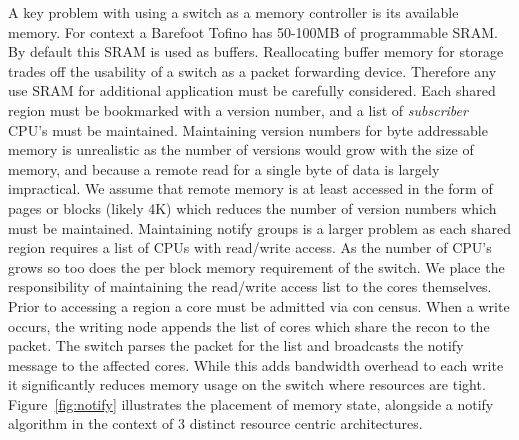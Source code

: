 A key problem with using a switch as a memory controller is its
available memory. For context a Barefoot Tofino has 50-100MB of
programmable SRAM. By default this SRAM is used as buffers.
Reallocating buffer memory for storage trades off the usability of a
switch as a packet forwarding device. Therefore any use SRAM for
additional application must be carefully considered. Each shared
region must be bookmarked with a version number, and a list of
\textit{subscriber} CPU's must be maintained.  Maintaining version
numbers for byte addressable memory is unrealistic as the number of
versions would grow with the size of memory, and because a remote read
for a single byte of data is largely impractical. We assume that
remote memory is at least accessed in the form of pages or blocks
(likely 4K) which reduces the number of version numbers which must be
maintained.  Maintaining notify groups is a larger problem as each
shared region requires a list of CPUs with read/write access. As the
number of CPU's grows so too does the per block memory requirement of
the switch.  We place the responsibility of maintaining the read/write
access list to the cores themselves.  Prior to accessing a region a
core must be admitted via con census.  When a write occurs, the
writing node appends the list of cores which share the recon to the
packet. The switch parses the packet for the list and broadcasts the
notify message to the affected cores. While this adds bandwidth
overhead to each write it significantly reduces memory usage on the
switch where resources are tight. Figure~\ref{fig:notify} illustrates
the placement of memory state, alongside a notify algorithm in the
context of 3 distinct resource centric architectures.

